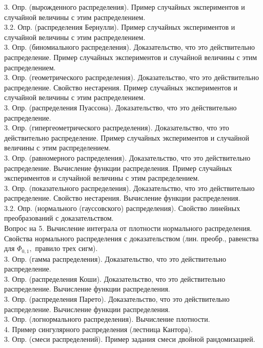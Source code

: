 \documentclass[10pt]{amsart}
\begin{document}
\begin{enumerate}
\begin{enumerate}
3. Опр. (вырожденного распределения). Пример случайных экспериментов и случайной величины с этим распределением. \\
3.2. Опр. (распределения Бернулли).  Пример случайных экспериментов и случайной величины с этим распределением. \\
3. Опр. (биномиального распределения). Доказательство, что это действительно распределение. Пример случайных экспериментов и случайной величины с этим распределением. \\     
3. Опр. (геометрического распределения). Доказательство, что это действительно распределение. Свойство нестарения. Пример случайных экспериментов и случайной величины с этим распределением. \\      
3. Опр. (распределения Пуассона). Доказательство, что это действительно распределение. \\
3. Опр. (гипергеометрического распределения). Доказательство, что это действительно распределение. Пример случайных экспериментов и случайной величины с этим распределением. \\      
3. Опр. (равномерного распределения). Доказательство, что это действительно распределение. Вычисление функции распределения. Пример случайных экспериментов и случайной величины с этим распределением. \\
3. Опр. (показательного распределения). Доказательство, что это действительно распределение. Свойство нестарения. Вычисление функции распределения. \\  
3.2. Опр. (нормального (гауссовского) распределения). Свойство линейных преобразований с доказательством. \\
Вопрос на 5. Вычисление интеграла от плотности нормального распределения.  Свойства нормального распределения с доказательством (лин. преобр., равенства для $\Phi_{0,1},$ правило трех сигм). \\
3. Опр. (гамма распределения). Доказательство, что это действительно распределение. \\
3. Опр. (распределения Коши). Доказательство, что это действительно распределение. Вычисление функции распределения. \\
3. Опр. (распределения Парето). Доказательство, что это действительно распределение. Вычисление функции распределения. \\
3. Опр. (логнормального распределения). Вычисление плотности. \\
4. Пример сингулярного распределения (лестница Кантора). \\
3. Опр. (смеси распределений). Пример задания смеси двойной рандомизацией. \\


\end{enumerate}
\end{enumerate}
\end{document}
